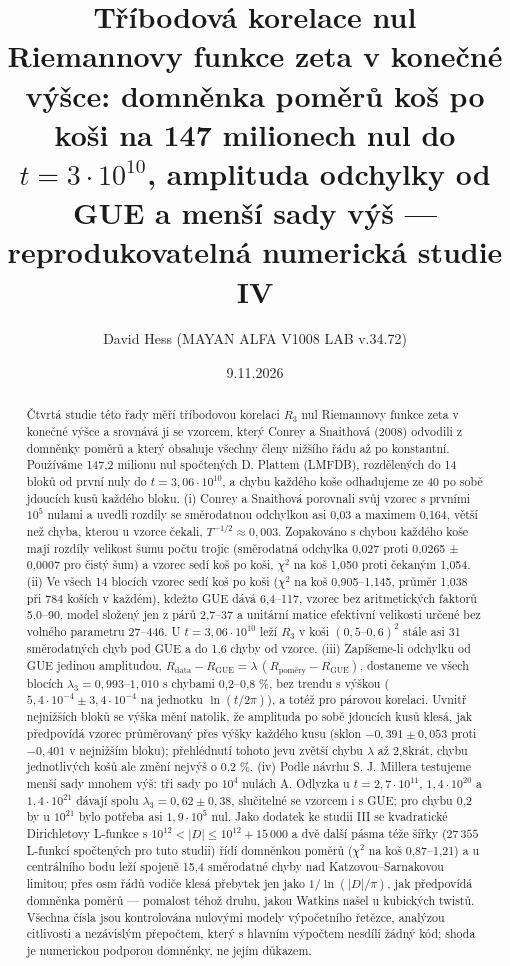 \documentclass[
  10pt,
]{article}
\title{Tříbodová korelace nul Riemannovy funkce zeta v konečné výšce:
domněnka poměrů koš po koši na 147 milionech nul do
\(t = 3\cdot10^{10}\), amplituda odchylky od GUE a menší sady výš ---
reprodukovatelná numerická studie IV}
\author{David Hess (MAYAN ALFA V1008 LAB v.34.72)}
\date{9.11.2026}
\begin{document}
\maketitle
\begin{abstract}
Čtvrtá studie této řady měří tříbodovou korelaci \(R_3\) nul Riemannovy
funkce zeta v konečné výšce a srovnává ji se vzorcem, který Conrey a
Snaithová (2008) odvodili z domněnky poměrů a který obsahuje všechny
členy nižšího řádu až po konstantní. Používáme 147,2 milionu nul
spočtených D. Plattem (LMFDB), rozdělených do 14 bloků od první nuly do
\(t = 3{,}06\cdot10^{10}\), a chybu každého koše odhadujeme ze 40 po
sobě jdoucích kusů každého bloku. (i) Conrey a Snaithová porovnali svůj
vzorec s prvními \(10^5\) nulami a uvedli rozdíly se směrodatnou
odchylkou asi 0,03 a maximem 0,164, větší než chyba, kterou u vzorce
čekali, \(T^{-1/2} \approx 0{,}003\). Zopakováno s chybou každého koše
mají rozdíly velikost šumu počtu trojic (směrodatná odchylka 0,027 proti
0,0265 ± 0,0007 pro čistý šum) a vzorec sedí koš po koši, \(\chi^2\) na
koš 1,050 proti čekaným 1,054. (ii) Ve všech 14 blocích vzorec sedí koš
po koši (\(\chi^2\) na koš 0,905--1,145, průměr 1,038 při 784 koších v
každém), kdežto GUE dává 6,4--117, vzorec bez aritmetických faktorů
5,0--90, model složený jen z párů 2,7--37 a unitární matice efektivní
velikosti určené bez volného parametru 27--446. U
\(t = 3{,}06\cdot10^{10}\) leží \(R_3\) v koši
\((0{,}5\text{–}0{,}6)^2\) stále asi 31 směrodatných chyb pod GUE a do
1,6 chyby od vzorce. (iii) Zapíšeme-li odchylku od GUE jedinou
amplitudou,
\(R_{\mathrm{data}} - R_{\mathrm{GUE}} = \lambda\,(R_{\mathrm{poměry}} - R_{\mathrm{GUE}})\),
dostaneme ve všech blocích \(\lambda_3 = 0{,}993\)--\(1{,}010\) s
chybami 0,2--0,8 \%, bez trendu s výškou
(\(5{,}4\cdot10^{-4} \pm 3{,}4\cdot10^{-4}\) na jednotku
\(\ln(t/2\pi)\)), a totéž pro párovou korelaci. Uvnitř nejnižších bloků
se výška mění natolik, že amplituda po sobě jdoucích kusů klesá, jak
předpovídá vzorec průměrovaný přes výšky každého kusu (sklon
\(-0{,}391 \pm 0{,}053\) proti \(-0{,}401\) v nejnižším bloku);
přehlédnutí tohoto jevu zvětší chybu \(\lambda\) až 2,8krát, chybu
jednotlivých košů ale změní nejvýš o 0,2 \%. (iv) Podle návrhu S. J.
Millera testujeme menší sady mnohem výš: tři sady po \(10^4\) nulách A.
Odlyzka u \(t = 2{,}7\cdot10^{11}\), \(1{,}4\cdot10^{20}\) a
\(1{,}4\cdot10^{21}\) dávají spolu \(\lambda_3 = 0{,}62 \pm 0{,}38\),
slučitelné se vzorcem i s GUE; pro chybu 0,2 by u \(10^{21}\) bylo
potřeba asi \(1{,}9\cdot10^5\) nul. Jako dodatek ke studii III se
kvadratické Dirichletovy L-funkce s
\(10^{12} < |D| \le 10^{12} + 15\,000\) a dvě další pásma téže šířky
(\(27\,355\) L-funkcí spočtených pro tuto studii) řídí domněnkou poměrů
(\(\chi^2\) na koš 0,87--1,21) a u centrálního bodu leží spojeně 15,4
směrodatné chyby nad Katzovou--Sarnakovou limitou; přes osm řádů vodiče
klesá přebytek jen jako \(1/\ln(|D|/\pi)\), jak předpovídá domněnka
poměrů --- pomalost téhož druhu, jakou Watkins našel u kubických twistů.
Všechna čísla jsou kontrolována nulovými modely výpočetního řetězce,
analýzou citlivosti a nezávislým přepočtem, který s hlavním výpočtem
nesdílí žádný kód; shoda je numerickou podporou domněnky, ne jejím
důkazem.
\end{abstract}
\end{document}
